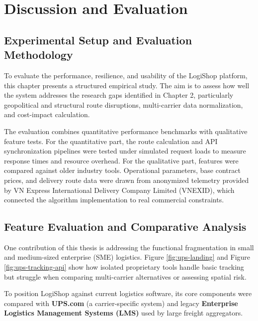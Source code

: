 \chapter{Discussion and Evaluation}
\label{ch:discussion-evaluation}

\section{Experimental Setup and Evaluation Methodology}

To evaluate the performance, resilience, and usability of the LogiShop platform, this chapter presents a structured empirical study. The aim is to assess how well the system addresses the research gaps identified in Chapter 2, particularly geopolitical and structural route disruptions, multi-carrier data normalization, and cost-impact calculation.

The evaluation combines quantitative performance benchmarks with qualitative feature tests. For the quantitative part, the route calculation and API synchronization pipelines were tested under simulated request loads to measure response times and resource overhead. For the qualitative part, features were compared against older industry tools. Operational parameters, base contract prices, and delivery route data were drawn from anonymized telemetry provided by VN Express International Delivery Company Limited (VNEXID), which connected the algorithm implementation to real commercial constraints.

\section{Feature Evaluation and Comparative Analysis}

One contribution of this thesis is addressing the functional fragmentation in small and medium-sized enterprise (SME) logistics. Figure \ref{fig:ups-landing} and Figure \ref{fig:ups-tracking-api} show how isolated proprietary tools handle basic tracking but struggle when comparing multi-carrier alternatives or assessing spatial risk.

To position LogiShop against current logistics software, its core components were compared with \textbf{UPS.com} (a carrier-specific system) and legacy \textbf{Enterprise Logistics Management Systems (LMS)} used by large freight aggregators.

